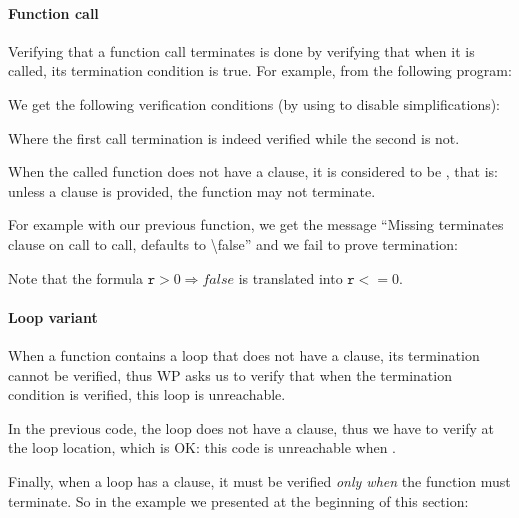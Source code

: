 

\paragraph{Function call}


Verifying that a function call terminates is done by verifying that when it is
called, its termination condition is true. For example, from the following
program:




We get the following verification conditions (by using 
to disable simplifications):






Where the first call termination is indeed verified while the second is not.


When the called function does not have a  clause, it
is considered to be , that is: unless a
 clause is provided, the function may not terminate.


For example with our previous  function, we get the message
``Missing terminates clause on call to call, defaults to \textbackslash{}false''
and we fail to prove termination:




Note that the formula $\mathtt{r} > 0 \Rightarrow false$ is translated into
$\mathtt{r} <= 0$.


\paragraph{Loop variant}


When a function contains a loop that does not have a 
clause, its termination cannot be verified, thus WP asks us to verify that when
the termination condition is verified, this loop is unreachable.




In the previous code, the loop does not have a 
clause, thus we have to verify 
at the loop location, which is OK: this code is unreachable when
.


Finally, when a loop has a  clause, it must be
verified {\em only when} the function must terminate. So in the example
we presented at the beginning of this section:



